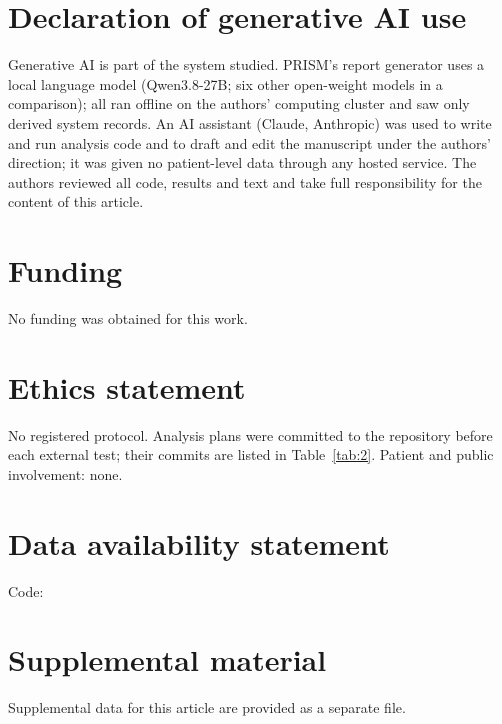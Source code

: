 \documentclass[largeformat]{interact} %
\begin{document}
\section*{Declaration of generative AI use}
 Generative AI is part of the system studied. PRISM's report generator uses
a local language model (Qwen3.8-27B; six other open-weight models in a comparison); all ran offline on the authors'
computing cluster and saw only derived system records. An AI assistant (Claude, Anthropic) was used to write and run
analysis code and to draft and edit the manuscript under the authors' direction; it was given no patient-level
data through any hosted service. The authors reviewed all code, results and text and take full responsibility for
the content of this article.

\section*{Funding}
No funding was obtained for this work.

\section*{Ethics statement}
 No registered protocol. Analysis plans were committed to the repository before each external
test; their commits are listed in Table~\ref{tab:2}. Patient and public involvement: none.

\section*{Data availability statement}
 Code: 

\section*{Supplemental material}
Supplemental data for this article are provided as a separate file.
\end{document}
